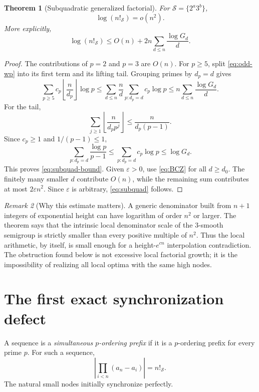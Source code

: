 \documentclass[11pt]{article}
\newtheorem{theorem}{Theorem}[section]
\theoremstyle{definition}
\theoremstyle{remark}
\newtheorem{remark}[theorem]{Remark}
\newcommand{\calS}{\mathcal S}
\newcommand{\floor}[1]{\left\lfloor #1\right\rfloor}
\newcommand{\abs}[1]{\left|#1\right|}
\begin{document}
\begin{theorem}[Subquadratic generalized factorial]\label{thm:subquadratic}
For $\calS=\{2^a3^b\}$,
\begin{equation}\label{eq:subquad}
       \log(n!_{\calS})=o(n^2).
\end{equation}
More explicitly,
\begin{equation}\label{eq:subquad-bound}
 \log(n!_{\calS})
 \le O(n)+2n\sum_{d\le n}\frac{\log G_d}{d}.
\end{equation}
\end{theorem}
\begin{proof}
The contributions of $p=2$ and $p=3$ are $O(n)$.  For $p\ge5$, split \eqref{eq:odd-wp} into its first term and its lifting tail.  Grouping primes by $d_p=d$ gives
\[
 \sum_{p\ge5}c_p\floor{\frac n{d_p}}\log p
 \le \sum_{d\le n}\frac nd
       \sum_{p:d_p=d}c_p\log p
 \le n\sum_{d\le n}\frac{\log G_d}{d}.
\]
For the tail,
\[
 \sum_{j\ge1}\floor{\frac n{d_pp^j}}
 \le\frac{n}{d_p(p-1)}.
\]
Since $c_p\ge1$ and $1/(p-1)\le1$,
\[
 \sum_{p:d_p=d}\frac{\log p}{p-1}
 \le\sum_{p:d_p=d}c_p\log p
 \le\log G_d.
\]
This proves \eqref{eq:subquad-bound}.  Given $\varepsilon>0$, use \eqref{eq:BCZ} for all $d\ge d_0$.  The finitely many smaller $d$ contribute $O(n)$, while the remaining sum contributes at most $2\varepsilon n^2$.  Since $\varepsilon$ is arbitrary, \eqref{eq:subquad} follows.
\end{proof}

\begin{remark}[Why this estimate matters]
A generic denominator built from $n+1$ integers of exponential height can have logarithm of order $n^2$ or larger.  The theorem says that the intrinsic local denominator scale of the $3$-smooth semigroup is strictly smaller than every positive multiple of $n^2$.  Thus the local arithmetic, by itself, is small enough for a height-$e^{cn}$ interpolation contradiction.  The obstruction found below is not excessive local factorial growth; it is the impossibility of realizing all local optima with the same high nodes.
\end{remark}

\section{The first exact synchronization defect}

A sequence is a \emph{simultaneous $p$-ordering prefix} if it is a $p$-ordering prefix for every prime $p$.  For such a sequence,
\[
       \abs{\prod_{i<n}(a_n-a_i)}=n!_{\calS}.
\]
The natural small nodes initially synchronize perfectly.
\end{document}
